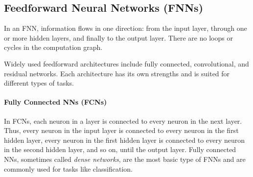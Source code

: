 \documentclass[oneside,11pt,dvipsnames]{book}
\numberwithin{equation}{section}
\theoremstyle{definition}
\theoremstyle{remark}
\begin{document}
\subsection{Feedforward Neural Networks (FNNs)}\label{sec:ffn}

In an FNN, information flows in one direction: from the input layer, through one or more hidden layers, and finally to the output layer. There are no loops or cycles in the computation graph. 

Widely used feedforward architectures include fully connected, convolutional, and residual networks. Each architecture has its own strengths and is suited for different types of tasks.

\paragraph{Fully Connected NNs (FCNs)}

In FCNs, each neuron in a layer is connected to every neuron in the next layer. Thus, every neuron in the input layer is connected to every neuron in the first hidden layer, every neuron in the first hidden layer is connected to every neuron in the second hidden layer, and so on, until the output layer. Fully connected NNs, sometimes called \emph{dense networks}, are the most basic type of FNNs and are commonly used for tasks like classification. 
\end{document}
